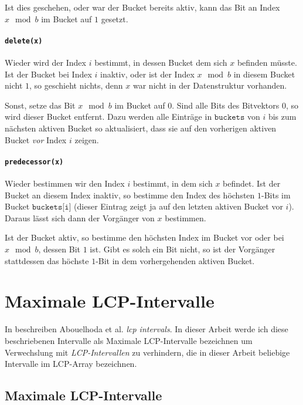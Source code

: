 Ist dies geschehen, oder war der Bucket bereits aktiv, kann das Bit an Index $x \mod b$ im Bucket auf $1$ gesetzt.

\paragraph{\texttt{delete(x)}}

Wieder wird der Index $i$ bestimmt, in dessen Bucket dem sich $x$ befinden müsste. Ist der Bucket bei Index $i$ inaktiv, oder ist der Index $x \mod b$ in diesem Bucket nicht $1$, so geschieht nichts, denn $x$ war nicht in der Datenstruktur vorhanden.

Sonst, setze das Bit $x \mod b$ im Bucket auf $0$. Sind alle Bits des Bitvektors $0$, so wird dieser Bucket entfernt. Dazu werden alle Einträge in $\texttt{buckets}$ von $i$ bis zum nächsten aktiven Bucket so aktualisiert, dass sie auf den vorherigen aktiven Bucket \textit{vor} Index $i$ zeigen.

\paragraph{\texttt{predecessor(x)}}

Wieder bestimmen wir den Index $i$ bestimmt, in dem sich $x$ befindet. Ist der Bucket an diesem Index inaktiv, so bestimme den Index des höchsten $1$-Bits im Bucket $\texttt{buckets[i]}$ (dieser Eintrag zeigt ja auf den letzten aktiven Bucket vor $i$). Daraus lässt sich dann der Vorgänger von $x$ bestimmen.

Ist der Bucket aktiv, so bestimme den höchsten Index im Bucket vor oder bei $x \mod b$, dessen Bit $1$ ist. Gibt es solch ein Bit nicht, so ist der Vorgänger stattdessen das höchste $1$-Bit in dem vorhergehenden aktiven Bucket.

\section{Maximale LCP-Intervalle}

In \cite{abouelhoda_optimal_2002} beschreiben Abouelhoda et al. \textit{lcp intervals}. In dieser Arbeit werde ich diese beschriebenen Intervalle als Maximale LCP-Intervalle bezeichnen um Verwechslung mit \textit{LCP-Intervallen} zu verhindern, die in dieser Arbeit beliebige Intervalle im LCP-Array bezeichnen.

\subsection{Maximale LCP-Intervalle}

